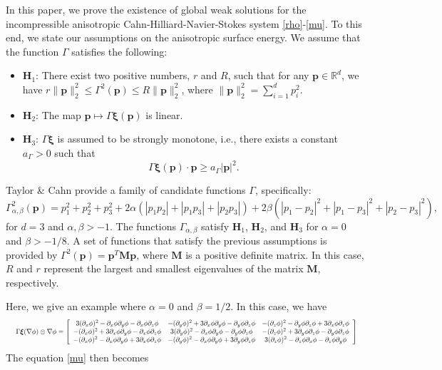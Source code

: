 \documentclass[11pt]{article}
\def\bq{\begin{equation}}
\def\eq{\end{equation}}
\def\bfp{\mathbf{p}}
\def\bfp{\mathbf{p}}
\def\bfxi{\boldsymbol{\xi}}
\def\bq{\begin{equation}}
\def\eq{\end{equation}}
\def\al{\alpha}
\def\Ga{\Gamma}
\begin{document}
In this paper, we prove the existence of global weak solutions for the incompressible anisotropic Cahn-Hilliard-Navier-Stokes system \eqref{rho}-\eqref{mu}. To this end, we state our assumptions on the anisotropic surface energy. We assume that the function $\Ga$ satisfies the following:
%
\begin{itemize}
\item $\textbf{H}_1$: There exist two positive numbers, $r$ and $R$, such that for any $\mathbf{p} \in \mathbb{R}^d$, we have \( r\|\mathbf{p}\|_2^2 \leq \Gamma^2(\mathbf{p}) \leq R\|\mathbf{p}\|_2^2 \), where \( \|\mathbf{p}\|_2^2 = \sum_{i=1}^d p_i^2 \).
\item $\textbf{H}_2$: The map \( \mathbf{p} \mapsto \Ga {\bfxi}(\mathbf{p}) \) is linear.
\item $\textbf{H}_3$: { %
$\Ga {\bfxi}$
is assumed to be strongly monotone, i.e., there
exists a constant $a_\Ga > 0$ such that
\[
\Ga {\bfxi}(\mathbf{p})\cdot  \mathbf{p} \geq a_\Ga |\bfp|^2.
\]
}
\end{itemize}
%
Taylor \& Cahn \cite{taylor-cahn98} provide a family of candidate functions $\Gamma$, specifically:
\[
\Gamma_{\alpha,\beta}^2 (\mathbf{p}) = p_1^2 + p_2^2 + p_3^2 + 2\alpha(|p_1 p_2| + |p_1 p_3| + |p_2 p_3|) + 2\beta(|p_1 - p_2|^2 + |p_1 - p_3|^2 + |p_2 - p_3|^2),
\]
for $d = 3$ and $\alpha, \beta > -1$. The functions $\Gamma_{\alpha,\beta}$ satisfy $\textbf{H}_1$, $\textbf{H}_2$, and $\textbf{H}_3$ for $ \alpha=0$ and $\beta > {-1}/{8}$. A set of functions that satisfy the previous assumptions is provided by $\Gamma^2(\mathbf{p}) = \mathbf{p}^T \mathbf{M} \mathbf{p}$, where $\mathbf{M}$ is a positive definite matrix. In this case, $R$ and $r$ represent the largest and smallest eigenvalues of the matrix $\mathbf{M}$, respectively.


Here, we give an example where $\al=0$ and $\beta = 1/2$. In this case, we have 
\bq
\resizebox{1\hsize}{!}{
$
\Ga\bfxi (\nabla\phi)\otimes\nabla\phi = \left[\begin{array}{ccc}
3(\partial_x\phi)^2 -\partial_x\phi\partial_y\phi-\partial_x\phi\partial_z\phi& -(\partial_y\phi)^2 + 3\partial_x\phi\partial_y\phi-\partial_y\phi\partial_z\phi & -(\partial_z\phi)^2 -\partial_y\phi\partial_z\phi+3\partial_x\phi\partial_z\phi \\
-(\partial_x\phi)^2 +3\partial_x\phi\partial_y\phi-\partial_x\phi\partial_z\phi & 3(\partial_y\phi)^2 -\partial_x\phi\partial_y\phi-\partial_y\phi\partial_z\phi & -(\partial_z\phi)^2 +3\partial_y\phi\partial_z\phi-\partial_y\phi\partial_z\phi \\
-(\partial_x\phi)^2 -\partial_x\phi\partial_y\phi+3\partial_x\phi\partial_z\phi & -(\partial_y\phi)^2 -\partial_x\phi\partial_y\phi+3\partial_y\phi\partial_z\phi & 3(\partial_z\phi)^2 -\partial_z\phi\partial_x\phi-\partial_z\phi\partial_y\phi
\end{array}\right]
$}
\eq
The equation \eqref{mu} then becomes
\end{document}
